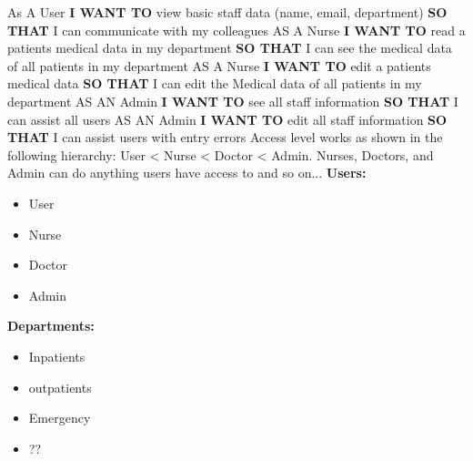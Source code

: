 As A User\newline
\textbf{I WANT TO} view basic staff data (name, email, department)\newline
\textbf{SO THAT} I can communicate with my colleagues\newline
\newline
AS A Nurse\newline
\textbf{I WANT TO} read a patients medical data in my department\newline
\textbf{SO THAT} I can see the medical data of all patients in my department\newline
\newline
AS A Nurse\newline
\textbf{I WANT TO} edit a patients medical data\newline
\textbf{SO THAT} I can edit the Medical data of all patients in my department\newline
\newline
AS AN Admin\newline
\textbf{I WANT TO} see all staff information\newline
\textbf{SO THAT} I can assist all users\newline
\newline
AS AN Admin\newline
\textbf{I WANT TO} edit all staff information\newline
\textbf{SO THAT} I can assist users with entry errors\newline
\newline
Access level works as shown in the following hierarchy:
\newline
User < Nurse < Doctor < Admin.
\newline
Nurses, Doctors, and Admin can do anything users have access to and so on...
\newline
\textbf{Users:}
\begin{itemize}
    \item User
    \item Nurse
    \item Doctor
    \item Admin
\end{itemize}

\textbf{Departments:}
\begin{itemize}
    \item Inpatients
    \item outpatients
    \item Emergency
    \item ??
\end{itemize}

